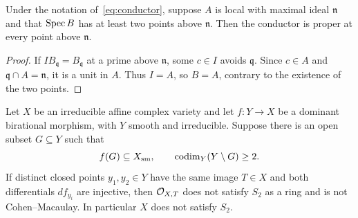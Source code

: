 \begin{lemma}\label{lem:proper-at-fiber}
Under the notation of~\eqref{eq:conductor}, suppose $A$ is local with
maximal ideal $\mathfrak n$ and that $\operatorname{Spec} B$ has at least two points
above $\mathfrak n$. Then the conductor is proper at every point above
$\mathfrak n$.
\end{lemma}

\begin{proof}
If $I B_{\mathfrak q}=B_{\mathfrak q}$ at a prime above
$\mathfrak n$, some $c\in I$ avoids $\mathfrak q$. Since $c\in A$
and $\mathfrak q\cap A=\mathfrak n$, it is a unit in $A$. Thus
$I=A$, so $B=A$, contrary to the existence of the two points.
\end{proof}

\begin{proposition}\label{prop:conductor-obstruction}
Let $X$ be an irreducible affine complex variety and let $f:Y\to X$
be a dominant birational morphism, with $Y$ smooth and irreducible. Suppose there is an open subset $G\subseteq Y$
such that
\[
 f(G)\subseteq X_{\mathrm{sm}},\qquad
 \operatorname{codim}_Y(Y\setminus G)\geq2.
\]
If distinct closed points $y_1,y_2\in Y$ have the same image $T\in X$
and both differentials $df_{y_i}$ are injective, then
$\mathcal O_{X,T}$ does not satisfy $S_2$ as a ring and is not
Cohen--Macaulay. In particular $X$ does not satisfy $S_2$.
\end{proposition}

